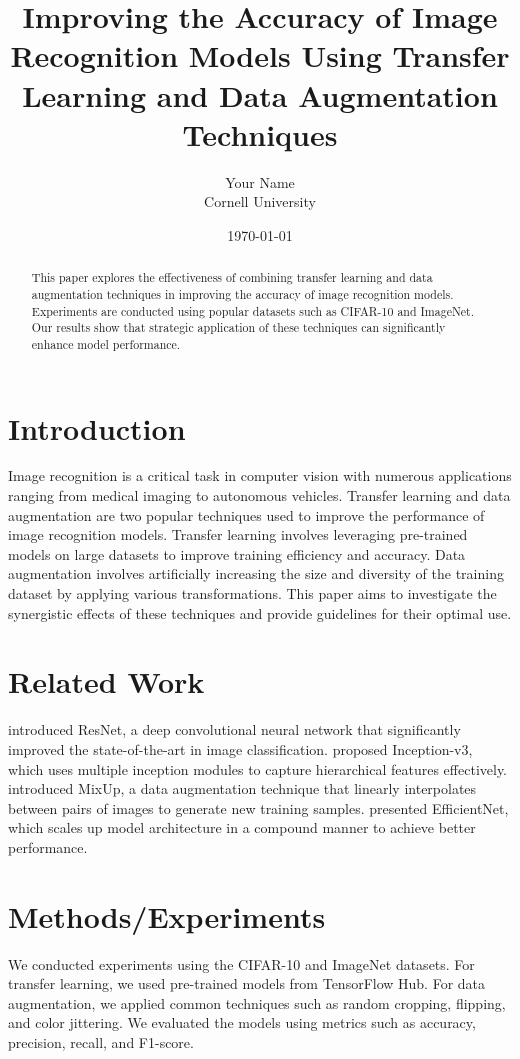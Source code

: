 \documentclass{article}
\title{Improving the Accuracy of Image Recognition Models Using Transfer Learning and Data Augmentation Techniques}
\author{Your Name \\ Cornell University}
\date{\today}
\begin{document}
\maketitle

\begin{abstract}
This paper explores the effectiveness of combining transfer learning and data augmentation techniques in improving the accuracy of image recognition models. Experiments are conducted using popular datasets such as CIFAR-10 and ImageNet. Our results show that strategic application of these techniques can significantly enhance model performance.
\end{abstract}

\section{Introduction}
\label{sec:introduction}
Image recognition is a critical task in computer vision with numerous applications ranging from medical imaging to autonomous vehicles. Transfer learning and data augmentation are two popular techniques used to improve the performance of image recognition models. Transfer learning involves leveraging pre-trained models on large datasets to improve training efficiency and accuracy. Data augmentation involves artificially increasing the size and diversity of the training dataset by applying various transformations. This paper aims to investigate the synergistic effects of these techniques and provide guidelines for their optimal use.

\section{Related Work}
\label{sec:related_work}
\cite{he2016deep} introduced ResNet, a deep convolutional neural network that significantly improved the state-of-the-art in image classification. \cite{szegedy2016rethinking} proposed Inception-v3, which uses multiple inception modules to capture hierarchical features effectively. \cite{zhang2017mixup} introduced MixUp, a data augmentation technique that linearly interpolates between pairs of images to generate new training samples. \cite{tan2019efficientnet} presented EfficientNet, which scales up model architecture in a compound manner to achieve better performance.

\section{Methods/Experiments}
\label{sec:methods}
We conducted experiments using the CIFAR-10 and ImageNet datasets. For transfer learning, we used pre-trained models from TensorFlow Hub. For data augmentation, we applied common techniques such as random cropping, flipping, and color jittering. We evaluated the models using metrics such as accuracy, precision, recall, and F1-score. 
\end{document}
